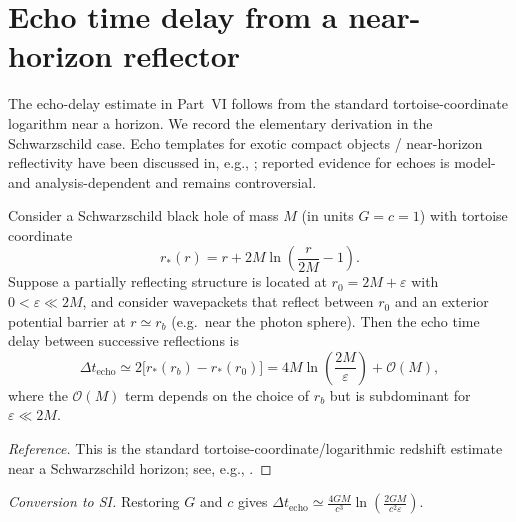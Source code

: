 \section{Echo time delay from a near-horizon reflector}
\label{app:echo_delay}
The echo-delay estimate in Part~VI follows from the standard tortoise-coordinate logarithm near a horizon. We record the elementary derivation in the Schwarzschild case. Echo templates for exotic compact objects / near-horizon reflectivity have been discussed in, e.g., \cite{CardosoFranzinPani2016Ringdown,AbediDykaarAfshordi2017Echoes}; reported evidence for echoes is model- and analysis-dependent and remains controversial.

\begin{proposition}
\label{prop:echo_delay}
Consider a Schwarzschild black hole of mass $M$ (in units $G=c=1$) with tortoise coordinate
\begin{equation}
    r_\ast(r)=r+2M\ln\!\left(\frac{r}{2M}-1\right).
\end{equation}
Suppose a partially reflecting structure is located at $r_0=2M+\varepsilon$ with $0<\varepsilon\ll 2M$, and consider wavepackets that reflect between $r_0$ and an exterior potential barrier at $r\simeq r_b$ (e.g.\ near the photon sphere). Then the echo time delay between successive reflections is
\begin{equation}
    \Delta t_{\mathrm{echo}}
    \simeq 2\bigl[r_\ast(r_b)-r_\ast(r_0)\bigr]
    = 4M\ln\!\left(\frac{2M}{\varepsilon}\right) + \mathcal{O}(M),
\end{equation}
where the $\mathcal{O}(M)$ term depends on the choice of $r_b$ but is subdominant for $\varepsilon\ll 2M$.
\end{proposition}
\begin{proof}[Reference]
This is the standard tortoise-coordinate/logarithmic redshift estimate near a Schwarzschild horizon; see, e.g., \cite{Carroll2004}.
\end{proof}
\noindent
\textit{Conversion to SI.} Restoring $G$ and $c$ gives $\Delta t_{\mathrm{echo}}\simeq \frac{4GM}{c^3}\ln\!\left(\frac{2GM}{c^2\varepsilon}\right)$.

